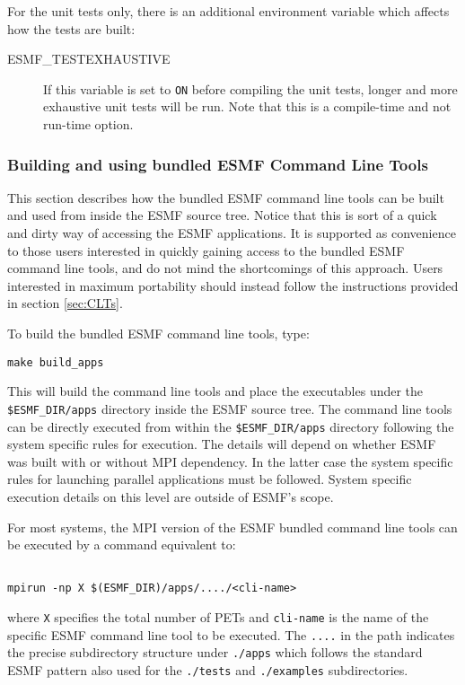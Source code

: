 For the unit tests only, there is an additional environment variable
which affects how the tests are built:
\begin{description}
\item[ESMF\_TESTEXHAUSTIVE]
If this variable is set to {\tt ON} before compiling the unit tests,
longer and more exhaustive unit tests will be run.  Note that this is a
compile-time and not run-time option.
\end{description}


\subsubsection{Building and using bundled ESMF Command Line Tools}
\label{quickapps}

This section describes how the bundled ESMF command line tools can be built
and used from inside the ESMF source tree. Notice that this is sort of a quick
and dirty way of accessing the ESMF applications. It is supported as
convenience to those users interested in quickly gaining access to the bundled
ESMF command line tools, and do not mind the shortcomings of this approach.
Users interested in maximum portability should instead follow the instructions
provided in section \ref{sec:CLTs}.

To build the bundled ESMF command line tools, type:
\begin{verbatim}
make build_apps
\end{verbatim}
This will build the command line tools and place the executables under the 
{\tt \$ESMF\_DIR/apps} directory inside the ESMF source tree. The 
command line tools can be directly executed from within the
{\tt \$ESMF\_DIR/apps} directory following the system specific rules for
execution. The details will depend on whether ESMF was built with or without
MPI dependency. In the latter case the system specific rules for launching
parallel applications must be followed. System specific execution details on
this level are outside of ESMF's scope.

For most systems, the MPI version of the ESMF bundled command line tools can be 
executed by a command equivalent to:

\begin{verbatim}

mpirun -np X $(ESMF_DIR)/apps/..../<cli-name>

\end{verbatim}
 
where {\tt X} specifies the total number of PETs and {\tt cli-name} is the 
name of the specific ESMF command line tool to be executed. The {\tt ....} in
the path indicates the precise subdirectory structure under {\tt ./apps} which
follows the standard ESMF pattern also used for the {\tt ./tests} and
{\tt ./examples} subdirectories.

